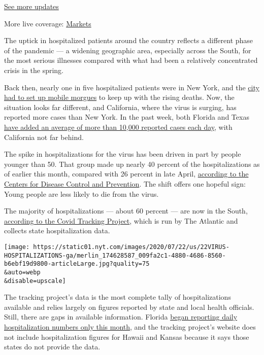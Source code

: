 \href{https://www.nytimes.com/2020/08/01/world/coronavirus-covid-19.html?action=click\&pgtype=Article\&state=default\&region=MAIN_CONTENT_1\&context=storylines_live_updates}{See
more updates}

More live coverage:
\href{https://www.nytimes.com/live/2020/07/31/business/stock-market-today-coronavirus?action=click\&pgtype=Article\&state=default\&region=MAIN_CONTENT_1\&context=storylines_live_updates}{Markets}

The uptick in hospitalized patients around the country reflects a
different phase of the pandemic --- a widening geographic area,
especially across the South, for the most serious illnesses compared
with what had been a relatively concentrated crisis in the spring.

Back then, nearly one in five hospitalized patients were in New York,
and the
\href{https://www.nytimes.com/2020/04/02/nyregion/coronavirus-new-york-bodies.html}{city
had to set up mobile morgues} to keep up with the rising deaths. Now,
the situation looks far different, and California, where the virus is
surging, has reported more cases than New York. In the past week, both
Florida and Texas
\href{https://www.nytimes.com/interactive/2020/us/coronavirus-us-cases.html}{have
added an average of more than 10,000 reported cases each day}, with
California not far behind.

The spike in hospitalizations for the virus has been driven in part by
people younger than 50. That group made up nearly 40 percent of the
hospitalizations as of earlier this month, compared with 26 percent in
late April,
\href{https://gis.cdc.gov/grasp/COVIDNet/COVID19_5.html}{according to
the Centers for Disease Control and Prevention}. The shift offers one
hopeful sign: Young people are less likely to die from the virus.

The majority of hospitalizations --- about 60 percent --- are now in the
South,
\href{https://covidtracking.com/data/charts/regional-current-hospitalizations}{according
to the Covid Tracking Project}, which is run by The Atlantic and
collects state hospitalization data.

\texttt{[image: https://static01.nyt.com/images/2020/07/22/us/22VIRUS-HOSPITALIZATIONS-ga/merlin\_174628587\_009fa2c1-4880-4686-8560-b6ebf19d9800-articleLarge.jpg?quality=75\\\&auto=webp\\\&disable=upscale]}

The tracking project's data is the most complete tally of
hospitalizations available and relies largely on figures reported by
state and local health officials. Still, there are gaps in available
information. Florida
\href{https://www.miamiherald.com/news/coronavirus/article243899367.html}{began
reporting daily hospitalization numbers only this month}, and the
tracking project's website does not include hospitalization figures for
Hawaii and Kansas because it says those states do not provide the data.

